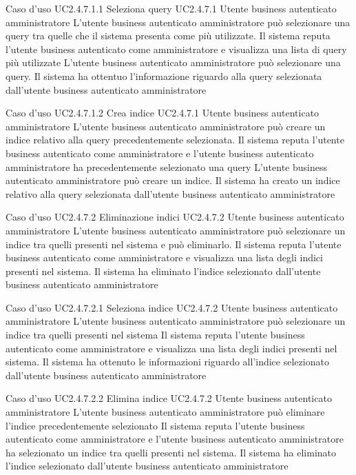 \UCtitle
{Caso d'uso UC2.4.7.1.1}
{Seleziona query}
\UC
{UC2.4.7.1}
{Utente business autenticato amministratore}
{L'utente business autenticato amministratore può selezionare una query tra quelle che il sistema presenta come più utilizzate.}
{Il sistema reputa l'utente business autenticato come amministratore e visualizza una lista di query più utilizzate}
\scenario
{L'utente business autenticato amministratore può selezionare una query.}
\post
{Il sistema ha ottentuo l'informazione riguardo alla query selezionata dall'utente business autenticato amministratore}

\UCtitle
{Caso d'uso UC2.4.7.1.2}
{Crea indice}
\UC
{UC2.4.7.1}
{Utente business autenticato amministratore}
{L'utente business autenticato amministratore può creare un indice relativo alla query precedentemente selezionata.}
{Il sistema reputa l'utente business autenticato come amministratore e l'utente business autenticato amministratore ha precedentemente selezionato una query}
\scenario
{L'utente business autenticato amministratore può creare un indice.}
\post
{Il sistema ha creato un indice relativo alla query selezionata dall'utente business autenticato amministratore}


\UCtitle
{Caso d'uso UC2.4.7.2}
{Eliminazione indici}
\UC
{UC2.4.7.2}
{Utente business autenticato amministratore}
{L'utente business autenticato amministratore può selezionare un indice tra quelli presenti nel sistema e può eliminarlo.}
{Il sistema reputa l'utente business autenticato come amministratore e visualizza una lista degli indici presenti nel sistema.}
\post
{Il sistema ha eliminato l'indice selezionato dall'utente business autenticato amministratore}

\UCtitle
{Caso d'uso UC2.4.7.2.1}
{Seleziona indice}
\UC
{UC2.4.7.2}
{Utente business autenticato amministratore}
{L'utente business autenticato amministratore può selezionare un indice tra quelli presenti nel sistema}
{Il sistema reputa l'utente business autenticato come amministratore e visualizza una lista degli indici presenti nel sistema.}
\post
{Il sistema ha ottenuto le informazioni riguardo all'indice selezionato dall'utente business autenticato amministratore}

\UCtitle
{Caso d'uso UC2.4.7.2.2}
{Elimina indice}
\UC
{UC2.4.7.2}
{Utente business autenticato amministratore}
{L'utente business autenticato amministratore può eliminare l'indice precedentemente selezionato}
{Il sistema reputa l'utente business autenticato come amministratore e l'utente business autenticato amministratore ha selezionato un indice tra quelli presenti nel sistema.}
\post
{Il sistema ha eliminato l'indice selezionato dall'utente business autenticato amministratore}


